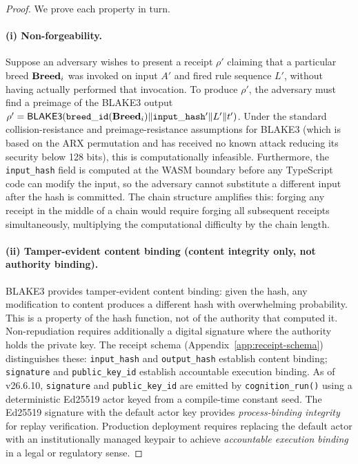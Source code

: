 \begin{proof}
We prove each property in turn.

\paragraph{(i) Non-forgeability.}
Suppose an adversary wishes to present a receipt $\rho'$ claiming that a particular breed
$\mathbf{Breed}_i$ was invoked on input $A'$ and fired rule sequence $L'$, without having actually
performed that invocation.  To produce $\rho'$, the adversary must find a preimage of the
BLAKE3 output
$\rho' = \mathsf{BLAKE3}(\mathtt{breed\_id}(\mathbf{Breed}_i) \| \mathtt{input\_hash'} \| L' \| t')$.
Under the standard collision-resistance and preimage-resistance assumptions for BLAKE3
(which is based on the ARX permutation and has received no known attack reducing its
security below 128 bits), this is computationally infeasible.  Furthermore, the
\texttt{input\_hash} field is computed at the WASM boundary before any TypeScript code
can modify the input, so the adversary cannot substitute a different input after the hash
is committed.  The chain structure amplifies this: forging any receipt in the middle of a
chain would require forging all subsequent receipts simultaneously, multiplying the
computational difficulty by the chain length.

\paragraph{(ii) Tamper-evident content binding (content integrity only, not authority binding).}
BLAKE3 provides tamper-evident content binding: given the hash, any modification to
content produces a different hash with overwhelming probability.  This is a property of
the hash function, not of the authority that computed it.  Non-repudiation requires
additionally a digital signature where the authority holds the private key.  The receipt
schema (Appendix~\ref{app:receipt-schema}) distinguishes these: \texttt{input\_hash} and
\texttt{output\_hash} establish content binding; \texttt{signature} and
\texttt{public\_key\_id} establish accountable execution binding.  As of v26.6.10,
\texttt{signature} and \texttt{public\_key\_id} are emitted by \texttt{cognition\_run()}
using a deterministic Ed25519 actor keyed from a compile-time constant seed.  The Ed25519 signature with the default actor key provides \emph{process-binding integrity}
for replay verification.  Production deployment requires replacing the default actor with
an institutionally managed keypair to achieve \emph{accountable execution binding} in a
legal or regulatory sense.


\end{proof}
